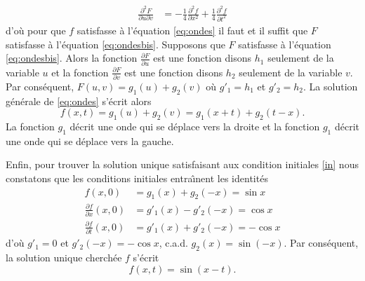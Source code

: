 {{\begin{align*}
\\
\frac{\partial^2 F}{\partial u \partial v}&= 
-\frac 14\frac{\partial^2 f}{\partial x^2}
+\frac 14\frac{\partial^2 f}{\partial t^2}
\end{align*}
d'o\`u pour que $f$ satisfasse \`a l'\'equation \eqref{eq:ondes} il faut et il suffit que $F$ satisfasse \`a l'\'equation
 \eqref{eq:ondesbis}.
Supposons que $F$ satisfasse \`a l'\'equation \eqref{eq:ondesbis}.
Alors la fonction $\frac{\partial F}{\partial u}$ est une fonction
disons $h_1$ seulement de la variable $u$
et la fonction $\frac{\partial F}{\partial v}$ est une fonction
disons $h_2$ seulement de la variable $v$.
Par cons\'equent,
$F(u,v)= g_1(u)+g_2(v)$ o\`u $g'_1=h_1$ et $g'_2=h_2$.
La solution g\'en\'erale de
\eqref{eq:ondes} s'\'ecrit alors
\[
f(x,t)=g_1(u)+g_2(v)=g_1(x+t)+g_2(t-x) .
\]
La fonction $g_1$ d\'ecrit
une onde qui se d\'eplace vers la droite et 
la fonction $g_1$ d\'ecrit
une onde qui se d\'eplace vers la gauche.

Enfin, pour trouver la solution unique
satisfaisant aux condition initiales \eqref{in} nous constatons que
les conditions initiales entra\^ \i nent les identit\'es
\begin{align*}
f(x,0)&=g_1(x)+g_2(-x)=\sin x
\\
\frac {\partial f}{\partial x}(x,0)&=g'_1(x)-g'_2(-x)=\cos x
\\
\frac {\partial f}{\partial t}(x,0)&=g'_1(x)+g'_2(-x)=-\cos x
\end{align*}
d'o\`u $g'_1=0$ et $g'_2(-x)=-\cos x$, c.a.d. 
$g_2(x)=\sin (-x)$. Par cons\'equent,
la solution unique cherch\'ee $f$ s'\'ecrit
\[
f(x,t)= \sin(x-t).
\]
}
}
